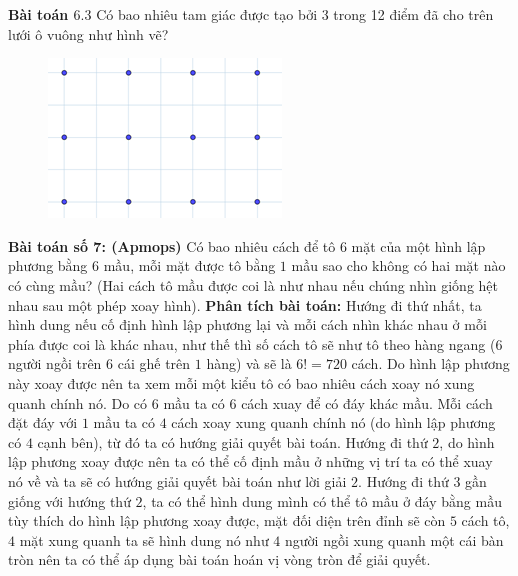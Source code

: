 \begin{multicols}{2}
\begin{figure}[H]
			\vspace*{-5pt}
		\end{figure}
		\textbf{\color{toancuabi}Bài toán $\pmb{6.3}$}
		Có bao nhiêu tam giác được tạo bởi 3 trong 12 điểm đã cho trên lưới ô vuông như hình vẽ?
		\begin{figure}[H]
			\centering
			\vspace*{-5pt}
			\captionsetup{labelformat=empty, justification=centering}
			\includegraphics[width=0.75\linewidth]{_12}
			\vspace*{-5pt}
		\end{figure}
	\textbf{\color{toancuabi}Bài toán số $\pmb{7}$: (Apmops)}
	\vskip 0.1cm
	Có bao nhiêu cách để tô $6$ mặt của một hình lập phương bằng $6$ mầu, mỗi mặt được tô bằng $1$ mầu sao cho không có hai mặt nào có cùng mầu? (Hai cách tô mầu được coi là như nhau nếu chúng nhìn giống hệt nhau sau một phép xoay hình). 
	\vskip 0.1cm
	\textbf{\color{toancuabi}Phân tích bài toán:} Hướng đi thứ nhất, ta hình dung nếu cố định hình lập phương lại và mỗi cách nhìn khác nhau ở mỗi phía được coi là khác nhau, như thế thì số cách tô sẽ như tô theo hàng ngang ($6$ người ngồi trên $6$ cái ghế trên $1$ hàng) và sẽ là $6!=720$ cách. Do hình lập phương này xoay được nên ta xem mỗi một kiểu tô có bao nhiêu cách xoay nó xung quanh chính nó. Do có $6$ mầu ta có $6$ cách xuay để có đáy khác mầu. Mỗi cách đặt đáy với $1$ mầu ta có $4$ cách xoay xung quanh chính nó (do hình lập phương có $4$ cạnh bên), từ đó ta có hướng giải quyết bài toán.
	\vskip 0.1cm
	Hướng đi thứ $2$, do hình lập phương xoay được nên ta có thể cố định mầu ở những vị trí ta có thể xuay nó về và ta sẽ có hướng giải quyết bài toán như lời giải $2$.
	\vskip 0.1cm
	Hướng đi thứ $3$ gần giống với hướng thứ $2$, ta có thể hình dung mình có thể tô mầu ở đáy bằng mầu tùy thích do hình lập phương xoay được, mặt đối diện trên đỉnh sẽ còn $5$ cách tô, $4$ mặt xung quanh ta sẽ hình dung nó như $4$ người ngồi xung quanh một cái bàn tròn nên ta có thể áp dụng bài toán hoán vị vòng tròn để giải quyết.

\end{multicols}
